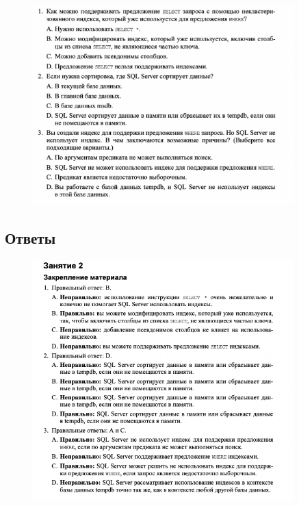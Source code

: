 \begin{figure}[h!]
	\begin{center}
		\includegraphics[width=0.9\textwidth]{img/zakrep44.png}
	\end{center}
	\captionsetup{justification=centering}
\end{figure}
\clearpage	

\subsection*{Ответы}

\begin{figure}[h!]
	\begin{center}
		\includegraphics[width=0.9\textwidth]{img/ans44.png}
	\end{center}
	\captionsetup{justification=centering}
\end{figure}



